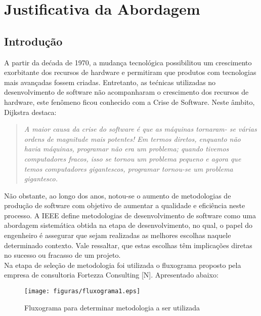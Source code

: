 
\chapter[Justificativa da Abordagem]{Justificativa da Abordagem}

{\large {\section { Introdução \\ } } }

\tab A partir da dećada de 1970, a mudança tecnológica  possibilitou um crescimento exorbitante dos recursos de hardware e permitiram que produtos com tecnologias mais avançadas fossem criadas. Entretanto, as tećnicas utilizadas no desenvolvimento  de software não acompanharam o crescimento dos recursos de hardware, este fenômeno ficou conhecido com a Crise de Software. Neste âmbito, Dijkstra destaca:\\

\begin{quote}
	\textsl
	{
		A maior causa da crise do software é que as máquinas tornaram-
		se várias ordens de magnitude mais potentes! Em termos diretos,
		enquanto não havia máquinas, programar não era um problema;
		quando tivemos computadores fracos, isso se tornou um problema
		pequeno e agora que temos computadores gigantescos, programar
		tornou-se um problema gigantesco.
	}
\end{quote}


\tab Não obstante,  ao longo dos anos, notou-se o aumento de metodologias de produção de software com objetivo de aumentar a qualidade e eficiência neste processo. A IEEE define metodologias de desenvolvimento de software como uma abordagem sistemática obtida na etapa de desenvolvimento, no qual, o papel do engenheiro é assegurar que sejam realizadas as melhores escolhas naquele determinado contexto. Vale ressaltar, que estas escolhas têm implicações diretas no sucesso ou fracasso de um projeto.\\

\tab Na etapa de seleção de metodologia foi utilizada o fluxograma proposto pela empresa de consultoria Fortezza Consulting [N]. Apresentado abaixo: \\


\begin{figure}[h]
	\centering
	\label{fig01}
		\texttt{[image: figuras/fluxograma1.eps]}
	\caption{Fluxograma para determinar metodologia a ser utilizada}
\end{figure}



